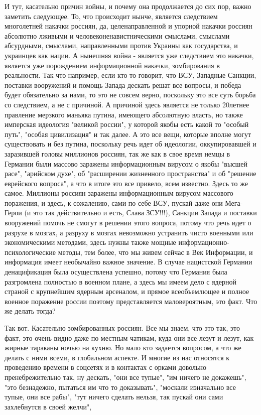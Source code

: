 И тут, касательно причин войны, и почему она продолжается до сих пор, важно
заметить следующее. То, что происходит нынче, является следствием многолетней
накачки россиян, да, целенаправленной и упорной накачки россиян абсолютно
лживыми и человеконенавистническими смыслами, смыслами абсурдными, смыслами,
направленными против Украины как государства, и украинцев как нации. А нынешняя
война - является уже следствием это накачки, является уже порождением
информационной накачки, зомбирования в реальности. Так что например, если кто
то говорит, что ВСУ, Западные Санкции, поставки вооружений и помощь Запада
дескать решат все вопросы, и победа будет обязательно за нами, то это не совсем
верно, поскольку это все суть борьба со следствием, а не с причиной.  А
причиной здесь является не только 20летнее правление мерзкого маньяка путина,
имеющего абсолютную власть, но также имперская идеология "великой россии", у
которой якобы есть какой то "особый путь", "особая цивилизация" и так далее. А
это все вещи, которые вполне могут существовать и без путина, поскольку речь
идет об идеологии, оккупировавшей и заразившей головы миллионов россиян, так же
как в свое время немцы в Германии были массово заражены информационным вирусом
о якобы "высшей расе", "арийском духе", об "расширении жизненного пространства"
и об "решение еврейского вопроса", а что в итоге это все привело, всем
известно. Здесь то же самое. Миллионы россиян заражены информационным вирусом
массового поражения, и здесь, к сожалению, сами по себе ВСУ, пускай даже они
Мега-Герои (и это так действительно и есть, Слава ЗСУ!!!), Санкции Запада и
поставки вооружений помочь не смогут в решении этого вопроса, потому что речь
идет о разрухе в мозгах, а разруху в мозгах невозможно устранить чисто военными
или экономическими методами, здесь нужны также мощные
информационно-психологические методы, тем более, что мы живем сейчас в Век
Информации, и информация имеет необычайно важное значение.  В случае нацистской
Германии денацификация была осуществлена успешно, потому что Германия была
разгромлена полностью в военном плане, а здесь мы имеем дело с ядерной страной
с крупнейшим ядерным арсеналом, и прямое всеобъемлющее и полное военное
поражение россии поэтому представляется маловероятным, это факт.  Что же делать
тогда?

Так вот. Касательно зомбированных россиян. Все мы знаем, что это так, это факт,
это очень видно даже по местным чатикам, куда они все лезут и лезут, как жирные
тараканы ночью на кухню.  Но мало кто задается вопросом, а что же делать с ними
всеми, в глобальном аспекте.  И многие из нас относятся к проведению времени в
соцсетях и в контактах с орками довольно пренебрежительно так, ну дескать, "они
все тупые", "им ничего не докажешь", "это безнадежно, пытаться им что то
доказывать", "москали изначально все тупые, они все рабы", "тут ничего сделать
нельзя, так пускай они сами захлебнутся в своей желчи", 


